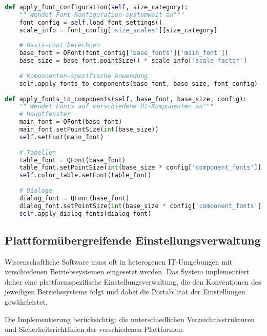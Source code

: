 \begin{lstlisting}[language=Python, caption=Dynamische Font-Skalierung]
def apply_font_configuration(self, size_category):
    """Wendet Font-Konfiguration systemweit an"""
    font_config = self.load_font_settings()
    scale_info = font_config['size_scales'][size_category]
    
    # Basis-Font berechnen
    base_font = QFont(font_config['base_fonts']['main_font'])
    base_size = base_font.pointSize() * scale_info['scale_factor']
    
    # Komponenten-spezifische Anwendung
    self.apply_fonts_to_components(base_font, base_size, font_config)
    
def apply_fonts_to_components(self, base_font, base_size, config):
    """Wendet Fonts auf verschiedene UI-Komponenten an"""
    # Hauptfenster
    main_font = QFont(base_font)
    main_font.setPointSize(int(base_size))
    self.setFont(main_font)
    
    # Tabellen
    table_font = QFont(base_font)
    table_font.setPointSize(int(base_size * config['component_fonts']['table_font_scale']))
    self.color_table.setFont(table_font)
    
    # Dialoge
    dialog_font = QFont(base_font)
    dialog_font.setPointSize(int(base_size * config['component_fonts']['dialog_font_scale']))
    self.apply_dialog_fonts(dialog_font)
\end{lstlisting}

\subsection{Plattformübergreifende Einstellungsverwaltung}

Wissenschaftliche Software muss oft in heterogenen IT-Umgebungen mit verschiedenen Betriebssystemen eingesetzt werden. Das System implementiert daher eine plattformspezifische Einstellungsverwaltung, die den Konventionen des jeweiligen Betriebssystems folgt und dabei die Portabilität der Einstellungen gewährleistet.

Die Implementierung berücksichtigt die unterschiedlichen Verzeichnisstrukturen und Sicherheitsrichtlinien der verschiedenen Plattformen:

